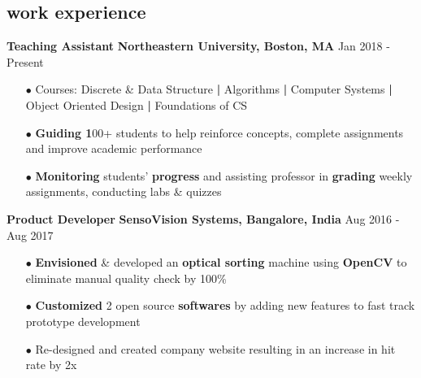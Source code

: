 \documentclass[a4paper, 10pt, oneside]{article}
\newcommand{\bulltetspace}{\vspace{-0.2em}}
\begin{document}
\begin{center}
\vspace{-1.em}
\section{\color{headings}work experience}
\vspace{-0.5em}
\color{headings}\textbf{Teaching Assistant}  \hfill \textbf{Northeastern University, Boston, MA} \hfill Jan 2018 - Present
\vspace{-0.3em}
\begin{itemize} 
\bulltetspace
\item[$\bullet$] Courses: Discrete \& Data Structure \textbf{|} Algorithms \textbf{|}  Computer Systems \textbf{|}  Object Oriented Design \textbf{|} Foundations of CS\\
\bulltetspace
\color{text1}
\item[$\bullet$] \textbf{Guiding 1}00+ students to help reinforce concepts, complete assignments and improve academic performance\\
\bulltetspace
\item[$\bullet$] \textbf{Monitoring} students' \textbf{progress} and assisting professor in \textbf{grading} weekly assignments, conducting labs \& quizzes \\
\end{itemize}

\color{headings}\textbf{Product Developer} \hfill \textbf{SensoVision Systems, Bangalore, India} \hfill Aug 2016 - Aug 2017
\vspace{-0.3em}
\color{text1}
\begin{itemize}
\bulltetspace
\item[$\bullet$] \textbf{Envisioned} \& developed an \textbf{optical sorting} machine using \color{headings}\textbf{OpenCV} to eliminate manual quality check by 100\% \\
\bulltetspace
\item[$\bullet$] \textbf{Customized} 2 open source \textbf{softwares} by adding new features to fast track prototype development\\
\bulltetspace
\item[$\bullet$] Re-designed and created company website resulting in an increase in hit rate by 2x


\end{itemize}
\end{center}
\end{document}
